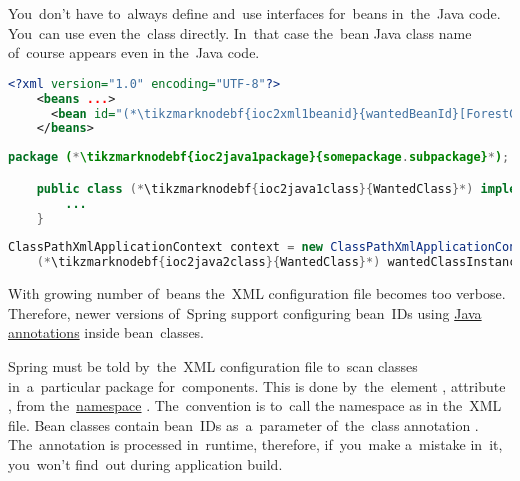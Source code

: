 \note You~don't have to~always define and~use interfaces for~beans in~the~Java code.
You~can use even the~class directly.
In~that case the~bean Java class name of~course appears even in the~Java code.
\newpage

\begin{lstlisting}[language=XML, title={Configuration XML}]
    <?xml version="1.0" encoding="UTF-8"?>
    <beans ...>
      <bean id="(*\tikzmarknodebf{ioc2xml1beanid}{wantedBeanId}[ForestGreen]*)" class="(*\tikzmarknodebf{ioc2xml1package}{somepackage.subpackage}[ForestGreen]*).(*\tikzmarknodebf{ioc2xml1class}{WantedClass}[ForestGreen]*)"/>
    </beans>
\end{lstlisting}
\begin{lstlisting}[language=Java, title={Wanted class}]
    package (*\tikzmarknodebf{ioc2java1package}{somepackage.subpackage}*);

    public class (*\tikzmarknodebf{ioc2java1class}{WantedClass}*) implements WantedClassInterface {
        ...
    }
\end{lstlisting}
\begin{lstlisting}[language=Java, title={Usage}]
    ClassPathXmlApplicationContext context = new ClassPathXmlApplicationContext("configurationFile.xml");
    (*\tikzmarknodebf{ioc2java2class}{WantedClass}*) wantedClassInstance = context.getBean("(*\tikzmarknodebf{ioc2java2beanid}{wantedBeanId}[ForestGreen]*)", (*\tikzmarknodebf{ioc2java2class2}{WantedClass}*).class);
\end{lstlisting}

\label{iocannotations}
With growing number of~beans the~XML configuration file becomes too verbose.
Therefore, newer versions of~Spring support configuring bean~IDs using \hyperref[javaannotation]{Java annotations} inside bean~classes.

Spring must be told by~the~XML configuration file to~scan classes in~a~particular package for~components.
This is done by~the~element , attribute , from the~\hyperref[namespaces]{namespace} .
The~convention is to~call the namespace as  in the~XML file.
Bean classes contain bean~IDs as~a~parameter of~the~class annotation .
The~annotation is processed in~runtime, therefore, if~you~make a~mistake in~it, you~won't find~out during application build.

